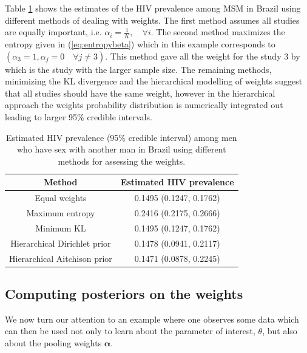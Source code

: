 \documentclass[a4paper, notitlepage, 10pt]{article}
\begin{document}
Table \ref{tab:probMeta} shows the estimates of the HIV prevalence among MSM in Brazil using different methods of dealing with weights. 
The first method assumes all studies are equally important, i.e. $\alpha_i = \frac{1}{K}, \quad \forall i$. The second method maximizes the entropy given in (\ref{eq:entropybeta}) which in this example corresponds to $(\alpha_3 = 1, \alpha_j = 0 \quad \forall j \neq 3)$. 
This method gave all the weight for the study 3 by \cite{sutmoller2002human} which is the study with the larger sample size. 
The remaining methods, minimizing the KL divergence and the hierarchical modelling of weights suggest that all studies should have the same weight, however in the hierarchical approach the weights probability distribution is numerically integrated out leading to larger 95\% credible intervals. 
\begin{table}[ht]
\caption{Estimated HIV prevalence (95\% credible interval) among men who have sex with another man in Brazil using different methods for assessing the weights.}
\centering
\label{tab:probMeta}
\begin{tabular}{cc}
 \hline
Method & Estimated HIV prevalence \\ 
 \hline
 Equal weights                & 0.1495 (0.1247, 0.1762) \\ 
 Maximum entropy              & 0.2416 (0.2175, 0.2666) \\ 
 Minimum KL                   & 0.1495 (0.1247, 0.1762) \\ 
 Hierarchical Dirichlet prior & 0.1478 (0.0941, 0.2117) \\ 
 Hierarchical Aitchison prior & 0.1471 (0.0878, 0.2245) \\ 
  \hline
\end{tabular}
\end{table}

\subsection{Computing posteriors on the weights}
\label{sec:posteriorProbs}

We now turn our attention to an example where one observes some data which can then be used not only to learn about the parameter of interest, $\theta$, but also about the pooling weights $\boldsymbol\alpha$.
\end{document}
